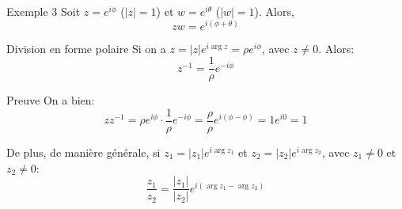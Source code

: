 \documentclass{article}
\begin{document}
\begin{parag}{Exemple 3}
    Soit $z = e^{i\phi}$ ($\left|z\right| = 1$) et $w = e^{i \theta}$ ($\left|w\right| = 1$). Alors,
    \[zw = e^{i\left(\phi + \theta\right)}\]
\end{parag}

\begin{parag}{Division en forme polaire}
    Si on a $z = \left|z\right| e^{i\arg z} = \rho e^{i \phi}$, avec $z \neq 0$. Alors:
    \[z^{-1} = \frac{1}{\rho} e^{-i \phi}\]

    \begin{subparag}{Preuve}
        On a bien:
        \[z z^{-1} = \rho e^{i \phi} \cdot \frac{1}{\rho} e^{-i\phi} = \frac{\rho}{\rho} e^{i\left(\phi - \phi\right)} = 1 e^{i0} = 1\]
    \end{subparag}

    De plus, de manière générale, si $z_1 = \left|z_1\right| e^{i \arg z_1}$ et $z_2 = \left|z_2\right| e^{i \arg z_2}$, avec $z_1 \neq 0$ et $z_2 \neq 0$:
    \[\frac{z_1}{z_2} = \frac{\left|z_1\right|}{\left|z_2\right|} e^{i\left(\arg z_1 - \arg z_2\right)}\]
\end{parag}
\end{document}
